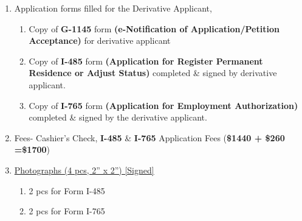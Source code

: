 \begin{enumerate}[label=\textbf{ Exhibit-\arabic*},start=15]
        \item {Application forms filled for the Derivative Applicant,}\begin{enumerate}[label=\roman*.]
       
        \item Copy of \textbf{G-1145} form \textbf{(e-Notification of Application/Petition Acceptance)} for derivative applicant
         \item {Copy of \textbf{I-485} form \textbf{(Application for Register Permanent Residence or Adjust Status)} completed \& signed by derivative applicant.}
        \item Copy of \textbf{I-765} form \textbf{(Application for Employment Authorization)} completed \& signed by the derivative applicant.
    \end{enumerate}
    \item Fees- Cashier's Check, \textbf{I-485} \& \textbf{I-765} Application Fees (\textbf{\$1440 + \$260 =\$1700})
    
    \item \hyperref[mim_exhibit2]{Photographs (4 pcs, 2” x 2”) [Signed]} \begin{enumerate}[label=\roman*.]
        \item {2 pcs for Form I-485}
        \item {2 pcs for Form I-765}
    \end{enumerate}



\end{enumerate}
